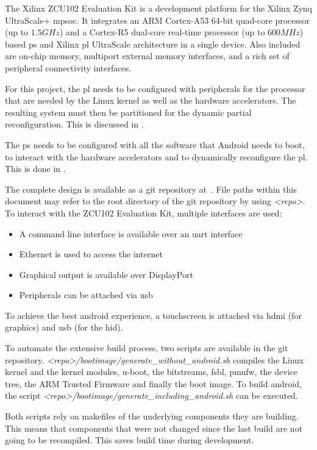 The Xilinx ZCU102 Evaluation Kit is a development platform for the Xilinx Zynq UltraScale+ \gls{mpsoc}.
It integrates an ARM Cortex-A53 64-bit quad-core processor (up to $1.5 GHz$) and a Cortex-R5 dual-core real-time processor (up to $600 MHz$) based \gls{ps} and Xilinx \gls{pl} UltraScale architecture in a single device. Also included are on-chip memory, multiport external memory interfaces, and a rich set of peripheral connectivity interfaces.

For this project, the \gls{pl} needs to be configured with peripherals for the
processor that are needed by the Linux kernel as well as the hardware
accelerators.
The resulting system must then be partitioned for the dynamic partial
reconfiguration.
This is discussed in .

The \gls{ps} needs to be configured with all the software that Android needs to
boot, to interact with the hardware accelerators and to dynamically reconfigure
the \gls{pl}.
This is done in .

The complete design is available as a git repository at~\cite{repo}.
File paths within this document may refer to the root directory of the git
repository by using \emph{<repo>}.
To interact with the ZCU102 Evaluation Kit, multiple interfaces are used:
\begin{itemize}
	\item A command line interface is available over an \gls{uart} interface
	\item Ethernet is used to access the internet
	\item Graphical output is available over DisplayPort
	\item Peripherals can be attached via \gls{usb}
\end{itemize}
To achieve the best android experience, a touchscreen is attached via \gls{hdmi}
(for graphics) and \gls{usb} (for the \gls{hid}).

To automate the extensive build process, two scripts are available in the git
repository.
\emph{<repo>/bootimage/generate\_without\_android.sh} compiles the Linux kernel and the kernel modules, u-boot, the bitstreams, \gls{fsbl}, \gls{pmufw}, the device tree, the ARM Trusted Firmware and finally the boot image. To build android, the script \emph{<repo>/bootimage/generate\_including\_android.sh} can be executed.

Both scripts rely on makefiles of the underlying components they are building. This means that components that were not changed since the last build are not going to be recompiled. This saves build time during development.


